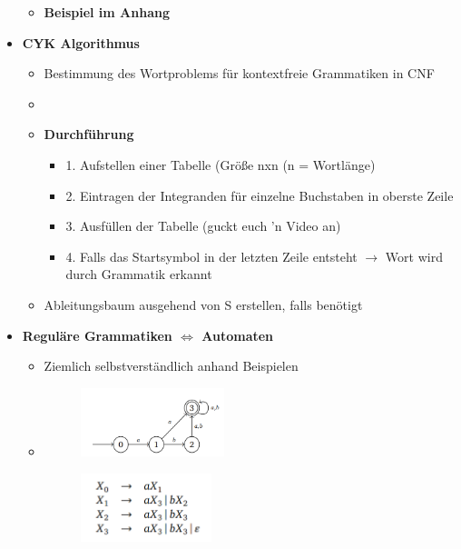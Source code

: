 \documentclass[11pt,a4paper]{article}
\begin{document}
\begin{itemize}
\begin{itemize}
	\item \textbf{Beispiel im Anhang}
	\end{itemize}


\item {\large \textbf{CYK Algorithmus}}
	\begin{itemize}
	\item Bestimmung des Wortproblems für kontextfreie Grammatiken in CNF
	\item[]
	\item \textbf{Durchführung}
		\begin{itemize}
		\item 1. Aufstellen einer Tabelle (Größe nxn (n = Wortlänge)
		\item 2. Eintragen der Integranden für einzelne Buchstaben in oberste Zeile
		\item 3. Ausfüllen der Tabelle (guckt euch 'n Video an)
		\item 4. Falls das Startsymbol in der letzten Zeile entsteht $\rightarrow$ Wort wird durch Grammatik erkannt
		\end{itemize}
	\item Ableitungsbaum ausgehend von S erstellen, falls benötigt
	\end{itemize}


\item {\large \textbf{Reguläre Grammatiken $\Leftrightarrow$ Automaten}}
	\begin{itemize}
	\item Ziemlich selbstverständlich anhand Beispielen
	\item[]
				\begin{minipage}{0.4\textwidth}
					\begin{figure}[H]
					\includegraphics[height=2cm]{Bilder/reggra1}
					\end{figure}
				\end{minipage}
				\begin{minipage}[t]{0.4\textwidth}
					\vspace{-1cm}
					\begin{figure}[H]
					\includegraphics[height=2cm]{Bilder/reggra2}
					\end{figure}
				\end{minipage}
	

\end{itemize}
\end{itemize}
\end{document}
